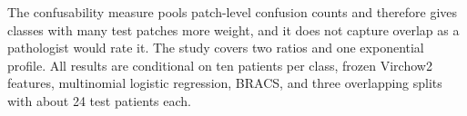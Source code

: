 The confusability measure pools patch-level confusion counts and therefore gives classes with many test patches more weight, and it does not capture overlap as a pathologist would rate it. The study covers two ratios and one exponential profile. All results are conditional on ten patients per class, frozen Virchow2 features, multinomial logistic regression, BRACS, and three overlapping splits with about 24 test patients each.
